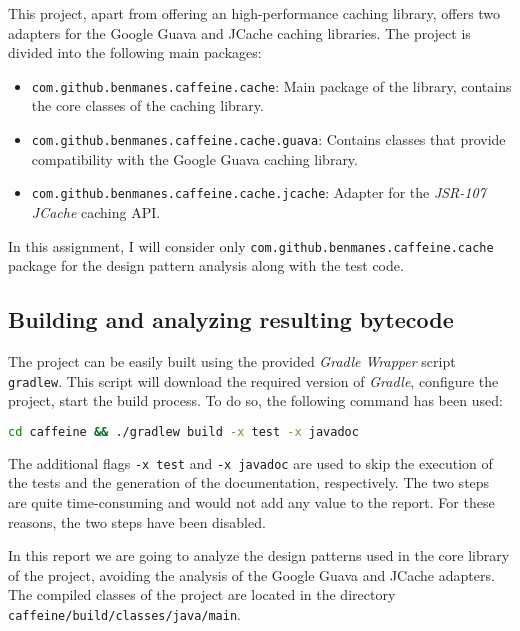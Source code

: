 This project, apart from offering an high-performance caching library, offers two adapters for the Google Guava and JCache caching libraries. The project is divided into the following main packages:

\begin{itemize}
	\item \texttt{com.github.benmanes.caffeine.cache}: Main package of the library, contains the core classes of the caching library.
	\item \texttt{com.github.benmanes.caffeine.cache.guava}: Contains classes that provide compatibility with the Google Guava caching library. \cite{caffeine:guava}
	\item \texttt{com.github.benmanes.caffeine.cache.jcache}: Adapter for the \textit{JSR-107 JCache} caching API. \cite{caffeine:jcache}
\end{itemize}

\noindent In this assignment, I will consider only \texttt{com.github.benmanes.caffeine.cache} package for the design pattern analysis along with the test code.

\subsection{Building and analyzing resulting bytecode}
\label{sec:building}

The project can be easily built using the provided \textit{Gradle Wrapper} script \texttt{gradlew}. This script will download the required version of \textit{Gradle}, configure the project, start the build process. To do so, the following command has been used:

\begin{lstlisting}[language=bash, caption={Building the Caffeine project with Gradle}]
              cd caffeine && ./gradlew build -x test -x javadoc
\end{lstlisting}

\noindent The additional flags \texttt{-x test} and \texttt{-x javadoc} are used to skip the execution of the tests and the generation of the documentation, respectively. The two steps are quite time-consuming and would not add any value to the report. For these reasons, the two steps have been disabled.

In this report we are going to analyze the design patterns used in the core library of the project, avoiding the analysis of the Google Guava and JCache adapters. The compiled classes of the project are located in the directory \texttt{caffeine/build/classes/java/main}.

